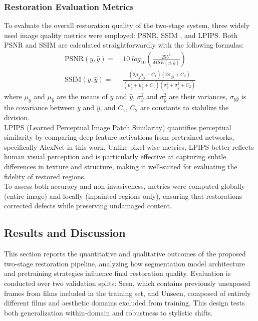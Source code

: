 \documentclass[10pt,a4paper,twocolumn,twoside]{article}
\begin{document}
\subsubsection{Restoration Evaluation Metrics}
\label{experimental_setup_metrics}
To evaluate the overall restoration quality of the two-stage system, three widely used image quality metrics were employed: PSNR, SSIM \cite{psnrssim}, and LPIPS.
Both PSNR and SSIM are calculated straightforwardly with the following formulas:
\begin{align*}
    \text{PSNR}(y,\hat{y}) =& \;10\;log_{10} \left( \frac{255^2}{MSE(y,\hat{y})}\right)\\
   \text{SSIM}(y, \hat{y}) =& \;\frac{(2\mu_y\mu_{\hat{y}} + C_1)(2\sigma_{y\hat{y}} + C_2)}{(\mu_y^2 + \mu_{\hat{y}}^2 + C_1)(\sigma_y^2 + \sigma_{\hat{y}}^2 + C_2)}
\end{align*}
where $\mu_y$ and $\mu_{\hat{y}}$ are the means of $y$ and $\hat{y}$, $\sigma_y^2$ and $\sigma_{\hat{y}}^2$ are their variances, $\sigma_{y\hat{y}}$ is the covariance between $y$ and $\hat{y}$, and $C_1$, $C_2$ are constants to stabilize the division. \\
LPIPS (Learned Perceptual Image Patch Similarity)\cite{lpips} quantifies perceptual similarity by comparing deep feature activations from pretrained networks, specifically AlexNet\cite{alexnet} in this work. Unlike pixel-wise metrics, LPIPS better reflects human visual perception and is particularly effective at capturing subtle differences in texture and structure, making it well-suited for evaluating the fidelity of restored regions. \\ To assess both accuracy and non-invasiveness, metrics were computed globally (entire image) and locally (inpainted regions only), ensuring that restorations corrected defects while preserving undamaged content.

\subsection{Results and Discussion}
This section reports the quantitative and qualitative outcomes of the proposed two-stage restoration pipeline, analyzing how segmentation model architecture and pretraining strategies influence final restoration quality. Evaluation is conducted over two validation splits: Seen, which contains previously unexposed frames from films included in the training set, and Unseen, composed of entirely different films and aesthetic domains excluded from training. This design tests both generalization within-domain and robustness to stylistic shifts.
\end{document}
